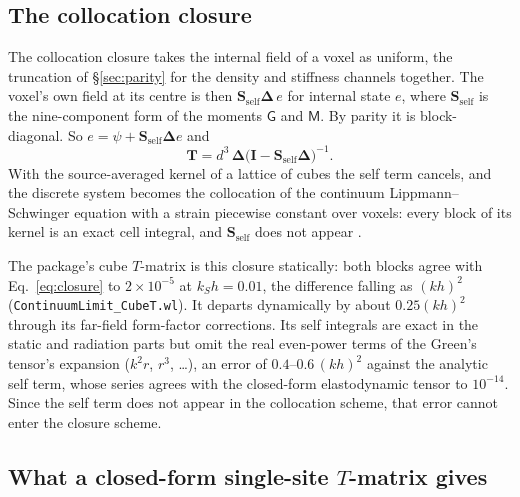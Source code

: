 \documentclass[11pt,a4paper]{article}
\newcommand{\bI}{\mathbf{I}}
\newcommand{\bS}{\mathbf{S}}
\newcommand{\bT}{\mathbf{T}}
\newcommand{\bD}{\boldsymbol{\Delta}}
\newcommand{\nb}[1]{\texttt{#1}}
\begin{document}
\subsection{The collocation closure}\label{sec:closure}

The collocation closure takes the internal field of a voxel as uniform, the truncation of
\S\ref{sec:parity} for the density and stiffness channels together. The voxel's own field at its
centre is then $\bS_{\text{self}}\bD\,e$ for internal state $e$, where $\bS_{\text{self}}$ is the
nine-component form of the moments $\mathsf G$ and $\mathsf M$. By parity it is block-diagonal. So
$e=\psi+\bS_{\text{self}}\bD e$ and
\begin{equation}\label{eq:closure}
  \bT=d^3\,\bD\bigl(\bI-\bS_{\text{self}}\bD\bigr)^{-1}.
\end{equation}
With the source-averaged kernel of a lattice of cubes the self term cancels, and the discrete system
becomes the collocation of the continuum Lippmann--Schwinger equation with a strain piecewise constant
over voxels: every block of its kernel is an exact cell integral, and $\bS_{\text{self}}$ does not appear
\citep{NestorError2026}.

The package's cube $T$-matrix is this closure statically: both blocks agree with
Eq.~\eqref{eq:closure} to $2\times10^{-5}$ at $k_Sh=0.01$, the difference falling
as $(kh)^2$ (\nb{ContinuumLimit\_CubeT.wl}). It departs dynamically by about $0.25(kh)^2$ through its
far-field form-factor corrections. Its self integrals are exact in the static and radiation parts
but omit the real even-power terms of the Green's tensor's expansion ($k^2r$, $r^3$, \dots), an
error of $0.4$--$0.6\,(kh)^2$ against the analytic self term, whose series agrees with the
closed-form elastodynamic tensor to $10^{-14}$. Since the self term does not appear in the collocation scheme, that error cannot enter
the closure scheme.

\subsection{What a closed-form single-site $T$-matrix gives}\label{sec:whyclosed}
\end{document}
